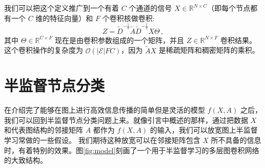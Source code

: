\documentclass{article} %
\begin{document}
我们可以把这个定义推广到一个有着 $C$ 个通道的信号  $X\in\mathbb{R}^{N\times C}$（即每个节点都有一个 $C$ 维的特征向量）和 $F$ 个卷积核做卷积:
\begin{equation}
  Z = \tilde{D}^{-\frac{1}{2}}\tilde{A}\tilde{D}^{-\frac{1}{2}}X\Theta \, ,
\label{eq:fourier-conv-approx4}
\end{equation}
其中 $\Theta\in\mathbb{R}^{C\times F}$ 现在是由卷积参数组成的一个矩阵，并且 $Z\in\mathbb{R}^{N\times F}$ 卷积结果。 这个卷积操作的复杂度为 $\mathcal{O}(|\mathcal{E}|FC)$，因为 $\tilde{A}X$ 是稀疏矩阵和稠密矩阵的乘积。

\section{半监督节点分类}
在介绍完了能够在图上进行高效信息传播的简单但是灵活的模型 $f(X,A)$ 之后，我们可以回到半监督节点分类问题上来。就像引言中概述的那样，通过把数据 $X$ 和代表图结构的邻接矩阵 $A$ 都作为 $f(X,A)$ 的输入，我们可以放宽图上半监督学习常做的一些假设。 我们期待这种放宽可以在邻接矩阵包含 $X$ 所不具备的信息时，有着特别的效果。图\ref{fig:model}刻画了一个用于半监督学习的多层图卷积网络的大致结构。
\end{document}
